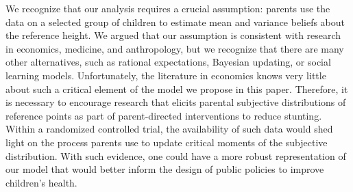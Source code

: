 We recognize that our analysis requires a crucial assumption: parents use the data on a selected group of children to estimate mean and variance beliefs about the reference height. We argued that our assumption is consistent with research in economics, medicine, and anthropology, but we recognize that there are many other alternatives, such as rational expectations, Bayesian updating, or social learning models. Unfortunately, the literature in economics knows very little about such a critical element of the model we propose in this paper. Therefore, it is necessary to encourage research that elicits parental subjective distributions of reference points as part of parent-directed interventions to reduce stunting. Within a randomized controlled trial, the availability of such data would shed light on the process parents use to update critical moments of the subjective distribution. With such evidence, one could have a more robust representation of our model that would better inform the design of public policies to improve children’s health.

\clearpage
\pagebreak
